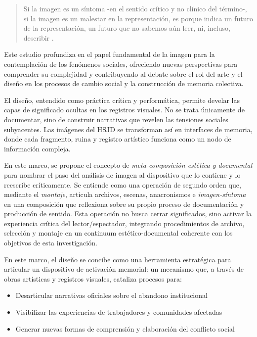 \begin{quote}
Si la imagen es un síntoma -en el sentido crítico y no clínico del término-, si la imagen es un malestar en la representación, es porque indica un futuro de la representación, un futuro que no sabemos aún leer, ni, incluso, describir \parencite[p. 177]{DidiHuberman2011}.
\end{quote}

Este estudio profundiza en el papel fundamental de la imagen para la contemplación de los fenómenos sociales, ofreciendo nuevas perspectivas para comprender su complejidad y contribuyendo al debate sobre el rol del arte y el diseño en los procesos de cambio social y la construcción de memoria colectiva.

El diseño, entendido como práctica crítica y performática, permite develar las capas de significado ocultas en los registros visuales. No se trata únicamente de documentar, sino de construir narrativas que revelen las tensiones sociales subyacentes. Las imágenes del HSJD se transforman así en interfaces de memoria, donde cada fragmento, ruina y registro artístico funciona como un nodo de información compleja.

\textcolor{edit30sept}{En este marco, se propone el concepto de \textit{meta-composición estética y documental} para nombrar el paso del análisis de imagen al dispositivo que lo contiene y lo reescribe críticamente. Se entiende como una operación de segundo orden que, mediante el \textit{montaje}, articula archivos, escenas, anacronismos e \textit{imagen-síntoma} en una composición que reflexiona sobre su propio proceso de documentación y producción de sentido. Esta operación no busca cerrar significados, sino activar la experiencia crítica del lector/espectador, integrando procedimientos de archivo, selección y montaje en un continuum estético-documental coherente con los objetivos de esta investigación.}

\textcolor{edit30sept}{En este marco, el diseño se concibe como una herramienta estratégica para articular un dispositivo de activación memorial: un mecanismo que, a través de obras artísticas y registros visuales, cataliza procesos para:}

\begin{itemize}
    \item Desarticular narrativas oficiales sobre el abandono institucional
    \item Visibilizar las experiencias de trabajadores y comunidades afectadas
    \item Generar nuevas formas de comprensión y elaboración del conflicto social
\end{itemize}

